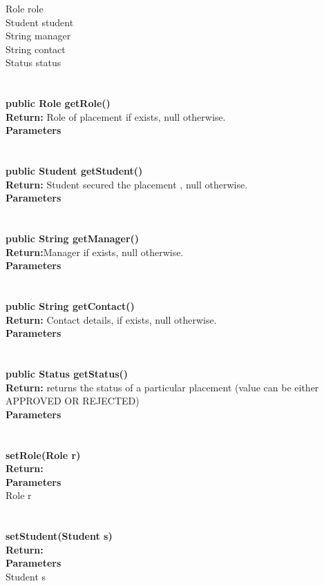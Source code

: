 \documentclass{l3deliverable}
\begin{document}
Role role\\
Student student\\
String manager\\
String contact\\
Status status\\
\\
\\
\textbf{public Role getRole()}\\
\textbf{Return: }Role of placement if exists, null otherwise.\\
\textbf{Parameters}\\
\\
\\
\textbf{public Student getStudent()}\\
\textbf{Return: }Student secured the placement , null otherwise.\\
\textbf{Parameters}\\
\\
\\
\textbf{public String getManager()}\\
\textbf{Return:}Manager if exists, null otherwise.\\
\textbf{Parameters}\\
\\
\\
\textbf{public String getContact()}\\
\textbf{Return: }Contact details, if exists, null otherwise.\\
\textbf{Parameters}\\
\\
\\
\textbf{public Status getStatus()}\\
\textbf{Return: }returns the status of a particular placement (value can be either APPROVED OR REJECTED)\\
\textbf{Parameters}\\
\\
\\
\textbf{setRole(Role r)}\\
\textbf{Return:}\\
\textbf{Parameters}\\
Role r\\
\\
\\
\textbf{setStudent(Student s)}\\
\textbf{Return:}\\
\textbf{Parameters}\\
Student s\\
\end{document}
